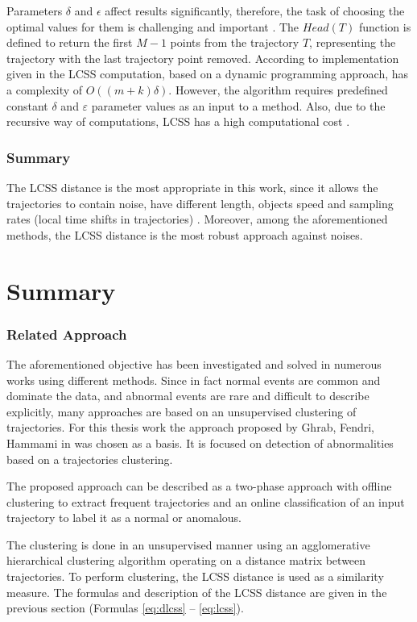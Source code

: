 Parameters $\delta$ and $\epsilon$ affect results significantly, therefore, the task of choosing the optimal values for them is challenging and important \cite{inproceedings:7_related_work}\cite{inproceedings:28_lcss_dsmt}. The $Head(T)$ function is defined to return the first $M - 1$ points from the trajectory $T$, representing the trajectory with the last trajectory point removed. According to implementation given in \cite{online:r_lcss} the LCSS computation, based on a dynamic programming approach, has a complexity of $O((m + k) \delta)$. However, the algorithm requires predefined constant $\delta$ and $\varepsilon$ parameter values as an input to a method. Also, due to the recursive way of computations, LCSS has a high computational cost \cite{inproceedings:comp_sim_meas_trcl}.

\subsubsection{Summary}
The LCSS distance is the most appropriate in this work, since it allows the trajectories to contain noise, have different length, objects speed and sampling rates (local time shifts in trajectories) \cite{inproceedings:7_related_work}. Moreover, among the aforementioned methods, the LCSS distance is the most robust approach against noises.

\section{Summary}
\subsubsection{Related Approach}
The aforementioned objective has been investigated and solved in numerous works using different methods. Since in fact normal events are common and dominate the data, and abnormal events are rare and difficult to describe explicitly, many approaches are based on an unsupervised clustering of trajectories. For this thesis work the approach proposed by Ghrab, Fendri, Hammami in \cite{inproceedings:7_related_work} was chosen as a basis. It is focused on detection of abnormalities based on a trajectories clustering.

The proposed approach can be described as a two-phase approach with offline clustering to extract frequent trajectories and an online classification of an input trajectory to label it as a normal or anomalous.

The clustering is done in an unsupervised manner using an agglomerative hierarchical clustering algorithm operating on a distance matrix between trajectories. To perform clustering, the LCSS distance is used as a similarity measure. The formulas and description of the LCSS distance are given in the previous section (Formulas \ref{eq:dlcss} -- \ref{eq:lcss}).

